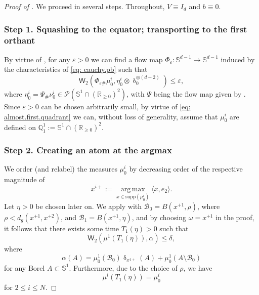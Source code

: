 \documentclass[a4paper,11pt]{article}
\theoremstyle{plain}
\newcommand{\argmax}{\mathop{\mathrm{arg\,max}}\limits}
\renewcommand{\S}{\mathbb{S}^{d-1}}
\newcommand{\bV}{\bm{\mathit{V}}}
\renewcommand{\leq}{\leqslant}
\renewcommand{\geq}{\geqslant}
\numberwithin{equation}{section}
\begin{document}
\begin{proof}[Proof of ]
     We proceed in several steps. Throughout, $\bV\equiv I_d$ and $b\equiv0$.


\subsubsection*{Step 1. Squashing to the equator; transporting to the first orthant}

By virtue of , for any $\varepsilon>0$ we can find a flow map $\Phi_{\varepsilon}:\S\to\S$ induced by the characteristics of \eqref{eq: cauchy.pb} such that 
\begin{equation} \label{eq: almost.first.quadrant}
    \mathsf{W}_2\left(\Phi_{\varepsilon\#}\mu_0^i, \eta_0^i\otimes\updelta_0^{\otimes(d-2)}\right)\leq\varepsilon,
\end{equation}
where $\eta^i_0=\Psi_\#\nu_0^i\in\mathscr{P}(\mathbb{S}^1\cap(\mathbb{R}_{\geq0})^2)$, with $\Psi$ being the flow map given by . Since $\varepsilon>0$ can be chosen arbitrarily small, by virtue of \eqref{eq: almost.first.quadrant} we can,  without loss of generality, assume that $\mu_0^i$ are defined on $\mathbb{Q}_1^1:=\mathbb{S}^1\cap(\mathbb{R}_{\geq0})^2$. 

\subsubsection*{Step 2. Creating an atom at the argmax}

We order (and relabel) the measures $\mu^i_0$ by decreasing order of the respective magnitude of 
$$x^{i+}:=\argmax_{x\in\mathrm{supp}(\mu^i_0)}\langle x, e_2\rangle.$$
Let $\eta>0$ be chosen later on.
We apply  with $\mathscr{B}_0=B(x^{+1},\rho)$, where $\rho<d_g(x^{+1},x^{+2})$, and $\mathscr{B}_1=B(x^{+1},\eta)$, and by choosing $\omega=x^{+1}$ in the proof, it follows that there exists some time $T_1(\eta)>0$ such that
\begin{equation} \label{eq: atom.in.argmax}
    \mathsf{W}_2\left(\mu^1(T_1(\eta)),\alpha\right)\leq\delta,
\end{equation}
where 
\begin{equation*}
    \alpha(A)=\mu_0^1(\mathscr{B}_0)\updelta_{x^{1+}}(A)+\mu_0^1(A\setminus \mathscr{B}_0)
\end{equation*}
for any Borel $A\subset\mathbb{S}^1$.
Furthermore, due to the choice of $\rho$, we have 
\begin{equation*}
    \mu^{i}(T_1(\eta))=\mu_0^i
\end{equation*}
for $2\leq i\leq N$.


\end{proof}
\end{document}
